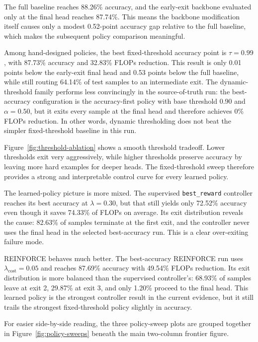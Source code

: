 \documentclass[10pt,twocolumn]{article}
\begin{document}
The full baseline reaches 88.26\% accuracy, and the early-exit backbone evaluated only at the final head reaches 87.74\%. This means the backbone modification itself causes only a modest 0.52-point accuracy gap relative to the full baseline, which makes the subsequent policy comparison meaningful.

Among hand-designed policies, the best fixed-threshold accuracy point is $\tau = 0.99$, with 87.73\% accuracy and 32.83\% FLOPs reduction. This result is only 0.01 points below the early-exit final head and 0.53 points below the full baseline, while still routing 64.14\% of test samples to an intermediate exit. The dynamic-threshold family performs less convincingly in the source-of-truth run: the best-accuracy configuration is the accuracy-first policy with base threshold 0.90 and $\alpha = 0.50$, but it exits every sample at the final head and therefore achieves 0\% FLOPs reduction. In other words, dynamic thresholding does not beat the simpler fixed-threshold baseline in this run.

Figure~\ref{fig:threshold-ablation} shows a smooth threshold tradeoff. Lower thresholds exit very aggressively, while higher thresholds preserve accuracy by leaving more hard examples for deeper heads. The fixed-threshold sweep therefore provides a strong and interpretable control curve for every learned policy.

The learned-policy picture is more mixed. The supervised \texttt{best\_reward} controller reaches its best accuracy at $\lambda = 0.30$, but that still yields only 72.52\% accuracy even though it saves 74.33\% of FLOPs on average. Its exit distribution reveals the cause: 82.63\% of samples terminate at the first exit, and the controller never uses the final head in the selected best-accuracy run. This is a clear over-exiting failure mode.

REINFORCE behaves much better. The best-accuracy REINFORCE run uses $\lambda_{\text{cost}} = 0.05$ and reaches 87.69\% accuracy with 49.54\% FLOPs reduction. Its exit distribution is more balanced than the supervised controller's: 68.93\% of samples leave at exit 2, 29.87\% at exit 3, and only 1.20\% proceed to the final head. This learned policy is the strongest controller result in the current evidence, but it still trails the strongest fixed-threshold policy slightly in accuracy.

For easier side-by-side reading, the three policy-sweep plots are grouped together in Figure~\ref{fig:policy-sweeps} beneath the main two-column frontier figure.
\end{document}
